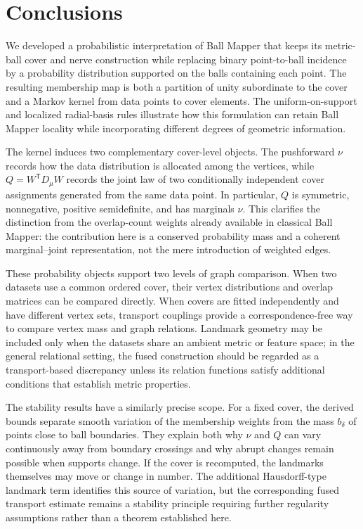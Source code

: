 \documentclass[9pt,a4paper,twocolumn,twoside]{extarticle}
\theoremstyle{definition}
\begin{document}
\section{Conclusions}

We developed a probabilistic interpretation of Ball Mapper that keeps its metric-ball cover and nerve construction while replacing binary point-to-ball incidence by a probability distribution supported on the balls containing each point.  The resulting membership map is both a partition of unity subordinate to the cover and a Markov kernel from data points to cover elements. The uniform-on-support and localized radial-basis rules illustrate how this formulation can retain Ball Mapper locality while incorporating different degrees of geometric information.

The kernel induces two complementary cover-level objects. The pushforward $\nu$ records how the data distribution is allocated among the vertices, while $Q=W^{\mathsf T}D_\mu W$ records the joint law of two conditionally independent cover assignments generated from the same data point. In particular, $Q$ is symmetric, nonnegative, positive semidefinite, and has marginals $\nu$. This clarifies the distinction from the overlap-count weights already available in classical Ball Mapper: the contribution here is a conserved probability mass and a coherent marginal--joint representation, not the mere introduction of weighted edges.

These probability objects support two levels of graph comparison. When two datasets use a common ordered cover, their vertex distributions and overlap matrices can be compared directly. When covers are fitted independently and have different vertex sets, transport couplings provide a correspondence-free way to compare vertex mass and graph relations. Landmark geometry may be included only when the datasets share an ambient metric or feature space; in the general relational setting, the fused construction should be regarded as a transport-based discrepancy unless its relation functions satisfy additional conditions that establish metric properties.

The stability results have a similarly precise scope.  For a fixed cover, the derived bounds separate smooth variation of the membership weights from the mass $b_\delta$ of points close to ball boundaries. They explain both why $\nu$ and $Q$ can vary continuously away from boundary crossings and why abrupt changes remain possible when supports change. If the cover is recomputed, the landmarks themselves may move or change in number. The additional Hausdorff-type landmark term identifies this source of variation, but the corresponding fused transport estimate remains a stability principle requiring further regularity assumptions rather than a theorem established here.
\end{document}
